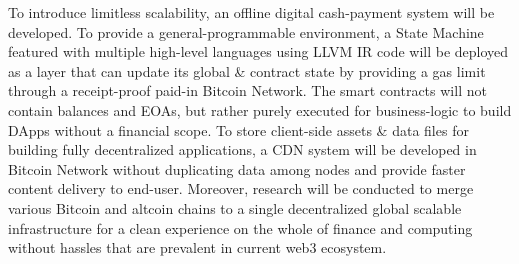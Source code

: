 \documentclass[a4paper,10pt]{article}
\begin{document}
To introduce limitless scalability, an offline digital cash-payment system will be developed. To provide a general-programmable environment, a State Machine featured with multiple high-level languages using LLVM \cite{llvm} IR code will be deployed as a layer that can update its global \& contract state by providing a gas limit through a receipt-proof paid-in Bitcoin Network. The smart contracts will not contain balances and EOAs, but rather purely executed for business-logic to build DApps without a financial scope. To store client-side assets \& data files for building fully decentralized applications, a CDN system will be developed in Bitcoin Network without duplicating data among nodes and provide faster content delivery to end-user. Moreover, research will be conducted to merge various Bitcoin and altcoin chains to a single decentralized global scalable infrastructure for a clean experience on the whole of finance and computing without hassles that are prevalent in current web3 ecosystem.



\end{document}
